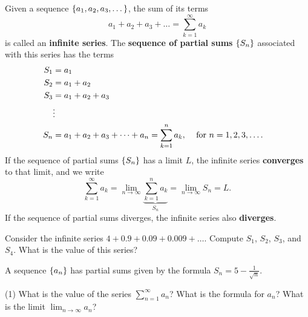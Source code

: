 \documentclass[../mathNotesPreamble]{subfiles}
\begin{document}
    \begin{defn*}
      Given a sequence ${\left\{a_1, a_2, a_3,\dots\right\}}$, the sum of its terms
        \[a_1+a_2+a_3+\dots=\sum_{k=1}^\infty a_k\]
      is called an \textbf{infinite series}. The \textbf{sequence of partial sums} ${\left\{S_n\right\}}$ associated with this series has the terms
        \begin{align*}
          S_1&=a_1\\
          S_2&=a_1+a_2\\
          S_3&=a_1+a_2+a_3\\
          &\vdots\\
          S_n&=a_1+a_2+a_3+\dots+a_n=\sum_{k=1}^n a_k, &&\textnormal{ for } n=1,2,3,\dots.
        \end{align*}
      If the sequence of partial sums ${\left\{S_n\right\}}$ has a limit $L$, the infinite series \textbf{converges} to that limit, and we write
        \[\sum_{k=1}^\infty a_k=\lim_{n\to \infty}\underbrace{\sum_{k=1}^n a_k}_{S_n}=\lim_{n\to \infty}S_n=L.\]
      If the sequence of partial sums diverges, the infinite series also \textbf{diverges}.
    \end{defn*}
    \pagebreak

    \begin{ex*}
      Consider the infinite series $4+0.9+0.09+0.009+\dots$. Compute $S_1$, $S_2$, $S_3$, and $S_4$. What is the value of this series?
    \end{ex*}
    \pagebreak

    \begin{ex*}
      A sequence ${\left\{a_n\right\}}$ has partial sums given by the formula $S_n=5-\frac{1}{\sqrt{n}}$. 
    \end{ex*}
    \begin{tasks}[after-item-skip=\stretch{1}, label=, item-indent=0pt](1)
      \task What is the value of the series $\displaystyle\sum_{n=1}^\infty a_n$?
      \task What is the formula for $a_n$?
      \task What is the limit $\displaystyle\lim_{n\to \infty} a_n$?
    \end{tasks}
    \pagebreak
\end{document}

